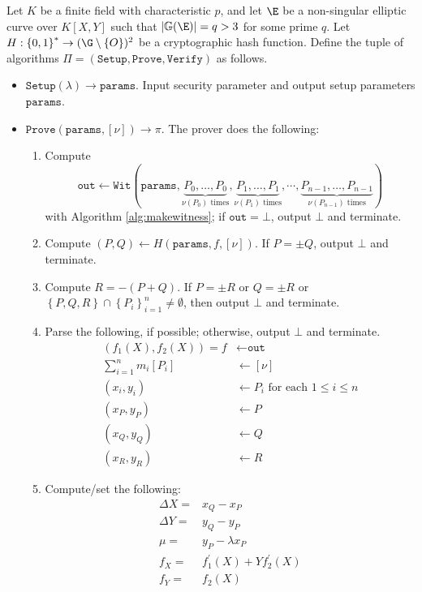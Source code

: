 \documentclass[11pt,letterpaper]{article}
\theoremstyle{definition}
\newcommand{\6}{\mathbf}
\newcommand{\7}{\mathcal}
\begin{document}
Let $K$ be a finite field with characteristic $p$, and let $\E$ be a non-singular elliptic curve over $K[X,Y]$ such that $\left|\mathbb{G}(\E)\right| = q > 3$ for some prime $q$. Let $H:\left\{0,1\right\}^* \to (\G\setminus\left\{O\right\})^2$ be a cryptographic hash function. Define the tuple of algorithms $\Pi = (\texttt{Setup}, \texttt{Prove}, \texttt{Verify})$ as follows. 
\begin{itemize}
\item $\texttt{Setup}(\lambda) \to \texttt{params}$. Input security parameter and output setup parameters $\texttt{params}$.
\item $\texttt{Prove}(\texttt{params}, [\nu]) \to \pi$. The prover does the following:
\begin{enumerate}
\item \label{prove1} Compute \[\texttt{out} \leftarrow \texttt{Wit}(\texttt{params}, \underbrace{P_0, \ldots, P_0}_{\nu(P_0)\text{ times}}, \underbrace{P_1, \ldots, P_1}_{\nu(P_1)\text{ times}}, \cdots, \underbrace{P_{n-1}, \ldots, P_{n-1}}_{\nu(P_{n-1})\text{ times}})\] with Algorithm \ref{alg:makewitness}; if $\texttt{out} = \bot$, output $\bot$ and terminate.
\item \label{prove2} Compute $(P, Q) \leftarrow H(\texttt{params}, f, [\nu])$. If $P = \pm Q$, output $\bot$ and terminate. \label{firststep}
\item \label{prove3} Compute $R = -(P + Q)$. If $P = \pm R$ or $Q = \pm R$ or $\left\{P, Q, R\right\} \cap \left\{P_i\right\}_{i=1}^{n} \neq \emptyset$, then output $\bot$ and terminate. %

\item \label{prove4} Parse the following, if possible; otherwise, output $\bot$ and terminate.
\begin{align}
(f_1(X), f_2(X)) = f &\leftarrow \texttt{out} \\%
\sum_{i=1}^{n} m_i [P_i] &\leftarrow [\nu] \\
(x_i, y_i) &\leftarrow P_i\text{ for each }1 \leq i \leq n \\
(x_P, y_P) &\leftarrow P \\
(x_Q, y_Q) &\leftarrow Q \\
(x_R, y_R) &\leftarrow R
\end{align}
\item \label{prove5} Compute/set the following: 
\begin{align}
\Delta X =& x_Q - x_P\\
\Delta Y =& y_Q - y_P\\
\mu =& y_P - \lambda x_P \\
f_X =& f_1^\prime(X) + Yf_2^\prime(X)\\
f_Y =& f_2(X)
\end{align}


\end{enumerate}
\end{itemize}
\end{document}
